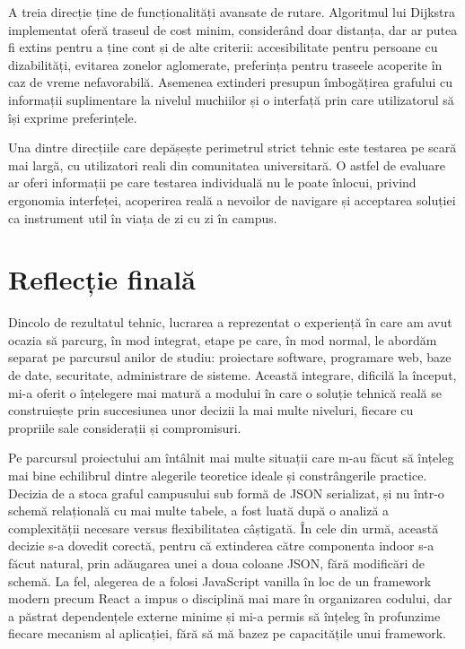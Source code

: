 A treia direcție ține de funcționalități avansate de rutare. Algoritmul lui
Dijkstra implementat oferă traseul de cost minim, considerând doar distanța, dar
ar putea fi extins pentru a ține cont și de alte criterii: accesibilitate pentru
persoane cu dizabilități, evitarea zonelor aglomerate, preferința pentru
traseele acoperite în caz de vreme nefavorabilă. Asemenea extinderi presupun
îmbogățirea grafului cu informații suplimentare la nivelul muchiilor și o
interfață prin care utilizatorul să își exprime preferințele.

Una dintre direcțiile care depășește perimetrul strict tehnic este testarea pe
scară mai largă, cu utilizatori reali din comunitatea universitară.
O astfel de evaluare ar oferi informații pe care testarea individuală nu le
poate înlocui, privind ergonomia interfeței, acoperirea reală a nevoilor de
navigare și acceptarea soluției ca instrument util în viața de zi cu zi în
campus.

\section*{Reflecție finală}
 
Dincolo de rezultatul tehnic, lucrarea a reprezentat o experiență în
care am avut ocazia să parcurg, în mod integrat, etape pe care, în mod normal,
le abordăm separat pe parcursul anilor de studiu: proiectare software,
programare web, baze de date, securitate, administrare de sisteme. Această
integrare, dificilă la început, mi-a oferit o înțelegere mai matură a modului în
care o soluție tehnică reală se construiește prin succesiunea unor decizii la
mai multe niveluri, fiecare cu propriile sale considerații și compromisuri.
 
Pe parcursul proiectului am întâlnit mai multe situații care m-au făcut să
înțeleg mai bine echilibrul dintre alegerile teoretice ideale și constrângerile
practice. Decizia de a stoca graful campusului sub formă de JSON serializat,
și nu într-o schemă relațională cu mai multe tabele, a fost luată după o
analiză a complexității necesare versus flexibilitatea câștigată. În
cele din urmă, această decizie s-a dovedit corectă, pentru că extinderea către
componenta indoor s-a făcut natural, prin adăugarea unei a doua coloane JSON,
fără modificări de schemă. La fel, alegerea de a folosi JavaScript vanilla
în loc de un framework modern precum React a impus o disciplină mai mare în
organizarea codului, dar a păstrat dependențele externe minime și mi-a permis
să înțeleg în profunzime fiecare mecanism al aplicației, fără să mă bazez pe
capacitățile unui framework.
 

